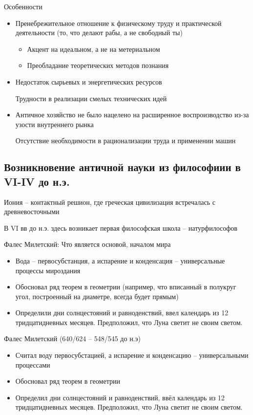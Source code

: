 \documentclass{book}
\theoremstyle{definition}
\begin{document}
    Особенности
    \begin{itemize}
        \item  Пренебрежительное отношение к физическому труду и практической деятельности (то, что делают рабы, а не свободный ты)
            \begin{itemize}
                \item Акцент на идеальном, а не на метериальном
                \item Преобладание теоретических методов познания
            \end{itemize}
        \item Недостаток сырьевых и энергетических ресурсов

            Трудности в реализации смелых технических идей
        \item Античное хозяйство не было нацелено на расширенное воспроизводство из-за узости внутреннего рынка

            Отсутствие необходимости в рационализации труда и применении машин
    \end{itemize}
    \subsection{Возникновение античной науки из философиии в VI-IV до н.э.}

    Иония -- контактный решион, где греческая цивилизация встречалась с древневосточными

    В VI вв до н.э. здесь возникает первая философская школа -- натурфилософов

    Фалес Милетский: Что является основой, началом мира
    \begin{itemize}
        \item  Вода -- первосубстанция, а испарение и конденсация -- универсальные процессы мироздания
        \item Обосновал ряд теорем в геометрии (например, что вписанный в полукруг угол, построенный на диаметре, всегда будет прямым)
        \item Определили дни солнцестояний и равноденствий, ввел календарь из 12 тридцатидневных месяцев. Предположил, что Луна светит не своим светом.
    \end{itemize}

    Фалес Милетский (640/624 -- 548/545 до н.э)

    \begin{itemize}
        \item Считал воду первосубстацией, а испарение и конденсацию -- универсальными процессами
        \item Обосновал ряд теорем в геометрии
        \item Определил дни солнцестояний и равноденствий, ввёл календарь из 12 тридцатидневных месяцев. Предположил, что Луна светит не своим светом.
    \end{itemize}
\end{document}
